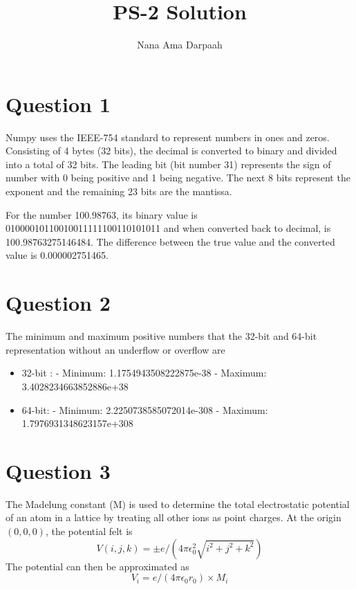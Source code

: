 \documentclass[11pt]{article}
\title{PS-2 Solution}
\author{Nana Ama Darpaah}
\begin{document}
	
\maketitle

\section{Question 1}
Numpy uses the IEEE-754 standard to represent numbers in ones and zeros. Consisting of 4 bytes (32 bits), the decimal is converted to binary and divided into a total of 32 bits.  The leading bit (bit number 31) represents the sign of number with 0 being positive and 1 being negative. The next 8 bits represent the exponent and the remaining 23 bits are the mantissa.


For the number 100.98763, its binary value is 01000010110010011111100110101011 and when converted back to decimal, is 100.98763275146484. The difference between the true value and the converted value is 0.000002751465.
	
	
\section{Question 2}
The minimum and maximum positive numbers that the 32-bit and 64-bit representation without an underflow or overflow are 

\begin{itemize}
	\item 32-bit : 
	- Minimum: 1.1754943508222875e-38
	- Maximum: 3.4028234663852886e+38
	
	\item  64-bit:
	- Minimum: 2.2250738585072014e-308
	- Maximum: 1.7976931348623157e+308
	
\end{itemize}


\section{Question 3}
The Madelung constant (M) is used to determine the total electrostatic potential of an atom in a lattice by treating all other ions as point charges. At the origin $(0,0,0)$, the potential felt is 
\begin{equation}
	V(i,j,k) = \pm e/(4\pi \epsilon_{0}^2 \sqrt{i^2 +j^2 +k^2})
\end{equation}
The potential can then be approximated as 
\begin{equation}
	V_{i} = e/(4\pi \epsilon_{0} r_{0}) \times M_{i}
\end{equation}
\end{document}
